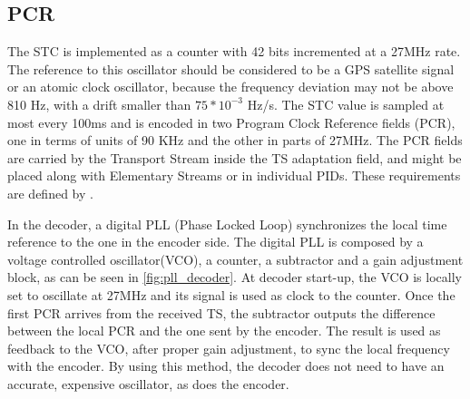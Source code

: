 \documentclass[
	12pt,				%
	openright,			%
	twoside,			%
	a4paper,			%
	brazil,
	french,				%
	english
	]{abntex2}
\begin{document}
\subsection{PCR}

The STC is implemented as a counter with 42 bits incremented at a 27MHz rate. The reference to this oscillator should be considered to be a GPS satellite signal or an atomic clock oscillator, because the frequency deviation may not be above 810 Hz, with a drift smaller than $ 75 * 10^{-3} $ Hz/s. The STC value is sampled at most every 100ms  and is encoded in two Program Clock Reference fields (PCR), one in terms of units of 90 KHz and the other in parts of 27MHz. The PCR fields are carried by the Transport Stream inside the TS adaptation field, and might be placed along with Elementary Streams or in individual PIDs. These requirements are defined by .

In the decoder, a digital PLL (Phase Locked Loop) synchronizes the local time reference to the one in the encoder side. The digital PLL is composed by a voltage controlled oscillator(VCO), a counter, a subtractor and a gain adjustment block, as can be seen in \autoref{fig:pll_decoder}. At decoder start-up, the VCO is locally set to oscillate at 27MHz and its signal is used as clock to the counter. Once the first PCR arrives from the received TS, the subtractor outputs the difference between the local PCR and the one sent by the encoder. The result is used as feedback to the VCO, after proper gain adjustment, to sync the local frequency with the encoder. By using this method, the decoder does not need to have an accurate, expensive oscillator, as does the encoder.
\end{document}
